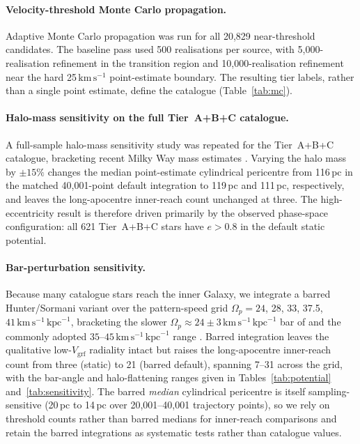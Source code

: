 \documentclass{aa}  %
\newcommand{\vgrf}{\ensuremath{V_{\mathrm{grf}}}\xspace}
\newcommand{\kms}{\ensuremath{\,\mathrm{km\,s^{-1}}}\xspace}
\newcommand{\kpc}{\ensuremath{\,\mathrm{kpc}}\xspace}
\begin{document}


\paragraph{Velocity-threshold Monte Carlo propagation.}
Adaptive Monte Carlo propagation was run for all 20{,}829
near-threshold candidates.  The baseline pass used 500 realisations per
source, with 5{,}000-realisation refinement in the transition region and
10{,}000-realisation refinement near the hard 25\kms point-estimate
boundary.  The resulting tier labels, rather than a single point
estimate, define the catalogue (Table~\ref{tab:mc}).



\paragraph{Halo-mass sensitivity on the full Tier~A+B+C catalogue.}
A full-sample halo-mass sensitivity study was repeated for the Tier~A+B+C catalogue, bracketing recent Milky Way mass estimates
\citep[e.g.][]{Cautun2020,Wang2020}.  Varying the halo mass by $\pm15\%$ changes the
 median point-estimate cylindrical pericentre from 116\,pc in the matched 40{,}001-point
default integration to 119\,pc and 111\,pc, respectively, and leaves the
long-apocentre inner-reach count unchanged at three.  The high-eccentricity result is
therefore driven primarily by the observed phase-space configuration:
all 621 Tier~A+B+C stars have $e>0.8$ in the default static
potential.

\paragraph{Bar-perturbation sensitivity.}
Because many catalogue stars reach the inner Galaxy, we integrate a barred
Hunter/Sormani variant \citep{Sormani2022} over the pattern-speed grid
$\Omega_p=24$, 28, 33, 37.5, $41\kms\kpc^{-1}$, bracketing the slower
$\Omega_p\approx24\pm3\kms\kpc^{-1}$ bar of \citet{Horta2025} and the
commonly adopted $35$--$45\kms\kpc^{-1}$ range
\citep{Clarke2019,Zhang2024LPV}.  Barred integration leaves the qualitative
low-\vgrf{} radiality intact but raises the long-apocentre inner-reach
count from three (static) to 21 (barred default), spanning 7--31 across the
grid, with the bar-angle and halo-flattening ranges given in
Tables~\ref{tab:potential} and~\ref{tab:sensitivity}.  The barred
 \emph{median} cylindrical pericentre is itself sampling-sensitive (20\,pc to 14\,pc
over 20{,}001--40{,}001 trajectory points), so we rely on threshold counts
rather than barred medians for inner-reach comparisons and retain the
barred integrations as systematic tests rather than catalogue values.
\end{document}

